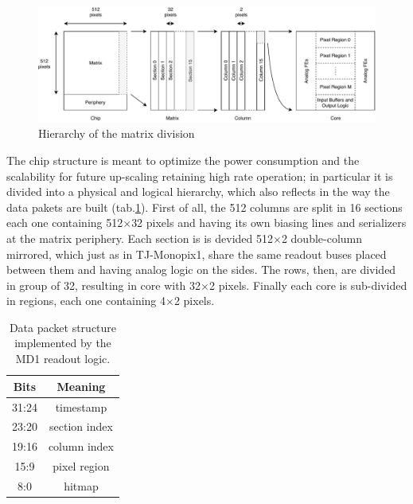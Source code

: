         \begin{figure}[h!]
            \centering
            \includegraphics[width=.98\linewidth]{figures/ARCADIA/hierarchy.pdf}
            \caption{Hierarchy of the matrix division}
            \label{fig:hierarchy}
        \end{figure}
        The chip structure is meant to optimize the power consumption and the scalability for future up-scaling retaining high rate operation; in particular it is divided into a physical and logical hierarchy, which also reflects in the way the data pakets are built (tab.\ref{tab:data_packet}).
        First of all, the 512 columns are split in 16 sections each one containing 512$\times$32 pixels and having its own biasing lines and serializers at the matrix periphery. 
        Each section is is devided 512$\times$2 double-column mirrored, which just as in TJ-Monopix1, share the same readout buses placed between them and having analog logic on the sides.        
        The rows, then, are divided in group of 32, resulting in core with 32$\times$2 pixels. Finally each core is sub-divided in regions, each one containing 4$\times$2 pixels. 
        \begin{table}
            \begin{center}
            \begin{tabular}{|c |c |}
            \hline
            Bits & Meaning  \\
            \hline
            \hline
            31:24 & timestamp\\
            23:20 & section index\\
            19:16 & column index\\
            15:9 & pixel region\\
            8:0 & hitmap\\
            \hline
            \end{tabular}
            \caption{Data packet structure implemented by the MD1 readout logic.}
            \label{tab:data_packet}
            \end{center}
        \end{table}

